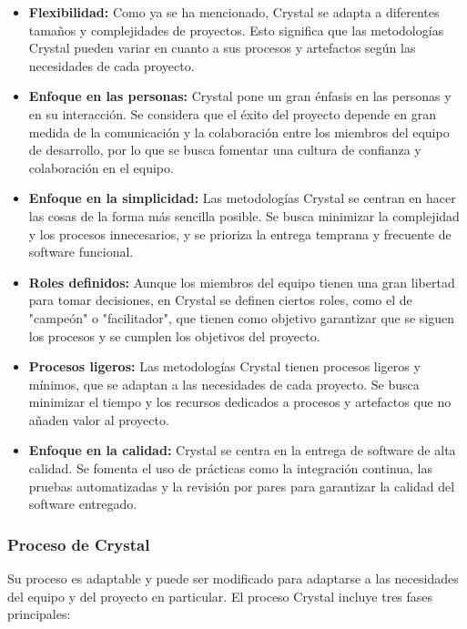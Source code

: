 \documentclass[executivepaper]{article}
\begin{document}
\begin{itemize}
\item \textbf{Flexibilidad:} Como ya se ha mencionado, Crystal se adapta a diferentes tamaños y complejidades de proyectos. Esto significa que las metodologías Crystal pueden variar en cuanto a sus procesos y artefactos según las necesidades de cada proyecto.
\item \textbf{Enfoque en las personas:} Crystal pone un gran énfasis en las personas y en su interacción. Se considera que el éxito del proyecto depende en gran medida de la comunicación y la colaboración entre los miembros del equipo de desarrollo, por lo que se busca fomentar una cultura de confianza y colaboración en el equipo.
\item \textbf{Enfoque en la simplicidad:} Las metodologías Crystal se centran en hacer las cosas de la forma más sencilla posible. Se busca minimizar la complejidad y los procesos innecesarios, y se prioriza la entrega temprana y frecuente de software funcional.
\item \textbf{Roles definidos:} Aunque los miembros del equipo tienen una gran libertad para tomar decisiones, en Crystal se definen ciertos roles, como el de "campeón" o "facilitador", que tienen como objetivo garantizar que se siguen los procesos y se cumplen los objetivos del proyecto.
\item \textbf{Procesos ligeros:} Las metodologías Crystal tienen procesos ligeros y mínimos, que se adaptan a las necesidades de cada proyecto. Se busca minimizar el tiempo y los recursos dedicados a procesos y artefactos que no añaden valor al proyecto.
\item \textbf{Enfoque en la calidad:} Crystal se centra en la entrega de software de alta calidad. Se fomenta el uso de prácticas como la integración continua, las pruebas automatizadas y la revisión por pares para garantizar la calidad del software entregado.
\end{itemize}

\subsubsection*{Proceso de Crystal}
Su proceso es adaptable y puede ser modificado para adaptarse a las necesidades del equipo y del proyecto en particular. El proceso Crystal incluye tres fases principales:
\end{document}
